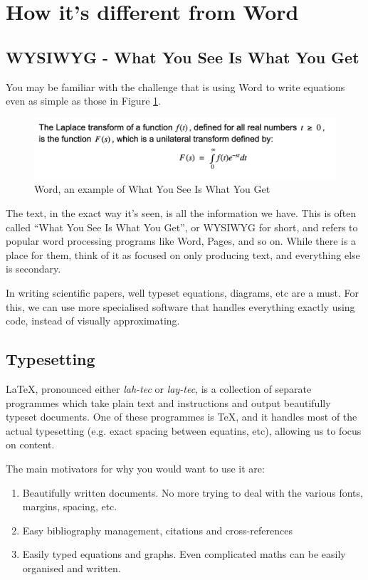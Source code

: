 \section{How it's different from Word}
    \subsection{WYSIWYG - What You See Is What You Get}
        You may be familiar with the challenge that is using Word to write equations even as simple as those in Figure \ref{fig:word}.

        \begin{figure}[h]
            \centering
            \includegraphics[scale=0.8]{figures/word.png}
            \caption{Word, an example of What You See Is What You Get}
            \label{fig:word}
        \end{figure}

        The text, in the exact way it's seen, is all the information we have.
        This is often called ``What You See Is What You Get'', or WYSIWYG for short, and refers to popular word processing programs like Word, Pages, and so on.
        While there is a place for them, think of it as focused on only producing text, and everything else is secondary.

        In writing scientific papers, well typeset equations, diagrams, etc are a must.
        For this, we can use more specialised software that handles everything exactly using code, instead of visually approximating.

    \subsection{Typesetting}
        \LaTeX, pronounced either \emph{lah-tec} or \emph{lay-tec}, is a collection of separate programmes which take plain text and instructions and output beautifully typeset documents.
        One of these programmes is \TeX, and it handles most of the actual typesetting (e.g. exact spacing between equatins, etc), allowing us to focus on content.

        The main motivators for why you would want to use it are:
        \begin{enumerate}
            \item Beautifully written documents. No more trying to deal with the various fonts, margins, spacing, etc.
            \item Easy bibliography management, citations and cross-references
            \item Easily typed equations and graphs. Even complicated maths can be easily organised and written.
        \end{enumerate}

